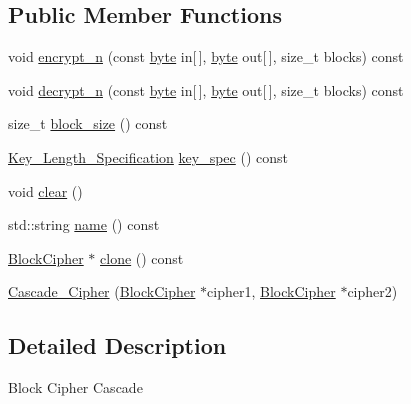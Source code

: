 \subsection*{Public Member Functions}
\begin{DoxyCompactItemize}
\item 
void \hyperlink{classBotan_1_1Cascade__Cipher_a5fc588adf477308dd996f93b94c764b6}{encrypt\-\_\-n} (const \hyperlink{namespaceBotan_a7d793989d801281df48c6b19616b8b84}{byte} in\mbox{[}$\,$\mbox{]}, \hyperlink{namespaceBotan_a7d793989d801281df48c6b19616b8b84}{byte} out\mbox{[}$\,$\mbox{]}, size\-\_\-t blocks) const 
\item 
void \hyperlink{classBotan_1_1Cascade__Cipher_a0360fec1e807147001ab788e670d4588}{decrypt\-\_\-n} (const \hyperlink{namespaceBotan_a7d793989d801281df48c6b19616b8b84}{byte} in\mbox{[}$\,$\mbox{]}, \hyperlink{namespaceBotan_a7d793989d801281df48c6b19616b8b84}{byte} out\mbox{[}$\,$\mbox{]}, size\-\_\-t blocks) const 
\item 
size\-\_\-t \hyperlink{classBotan_1_1Cascade__Cipher_a5e6616c2a03c21732f1ac33ac4a2da34}{block\-\_\-size} () const 
\item 
\hyperlink{classBotan_1_1Key__Length__Specification}{Key\-\_\-\-Length\-\_\-\-Specification} \hyperlink{classBotan_1_1Cascade__Cipher_af886740ca6c3b271730e89fbcce1828f}{key\-\_\-spec} () const 
\item 
void \hyperlink{classBotan_1_1Cascade__Cipher_aa448403e9ae89bf477028f8bafc2f6a3}{clear} ()
\item 
std\-::string \hyperlink{classBotan_1_1Cascade__Cipher_af1cda06df8e4ff4f92279af87c0f496e}{name} () const 
\item 
\hyperlink{classBotan_1_1BlockCipher}{Block\-Cipher} $\ast$ \hyperlink{classBotan_1_1Cascade__Cipher_a6a4196bdefe12d3bf20ba015160a1759}{clone} () const 
\item 
\hyperlink{classBotan_1_1Cascade__Cipher_a7203bbe1064b5ec656775d8e84b13834}{Cascade\-\_\-\-Cipher} (\hyperlink{classBotan_1_1BlockCipher}{Block\-Cipher} $\ast$cipher1, \hyperlink{classBotan_1_1BlockCipher}{Block\-Cipher} $\ast$cipher2)
\end{DoxyCompactItemize}


\subsection{Detailed Description}
Block Cipher Cascade 

